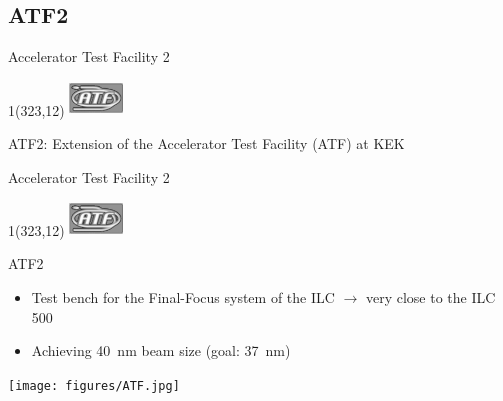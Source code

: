 \documentclass[xcolor={dvipsnames}]{beamer}
\newcommand{\atflogo}{
  \setlength{\TPHorizModule}{1pt}
  \setlength{\TPVertModule}{1pt}
  \begin{textblock}{1}(323,12)
   \includegraphics[width=40pt,height=26pt]{figures/ATF_logo.jpg}
  \end{textblock}
}
\begin{document}
\subsection{ATF2}
\begin{frame}{Accelerator Test Facility 2}
\atflogo
ATF2: Extension of the Accelerator Test Facility (ATF) at KEK
\vspace*{0.3cm}
\begin{center}
\end{center}

\end{frame}

\begin{frame}{Accelerator Test Facility 2}
\atflogo
ATF2
\begin{itemize}
\item Test bench for the Final-Focus system of the ILC $\rightarrow$ very close to the ILC 500
\item Achieving \SI{40}{\nano\metre} beam size (goal: \SI{37}{\nano\metre})
\end{itemize}
\vspace*{0.3cm}
\begin{center}
 \texttt{[image: figures/ATF.jpg]}
\end{center}

\end{frame}
\end{document}
